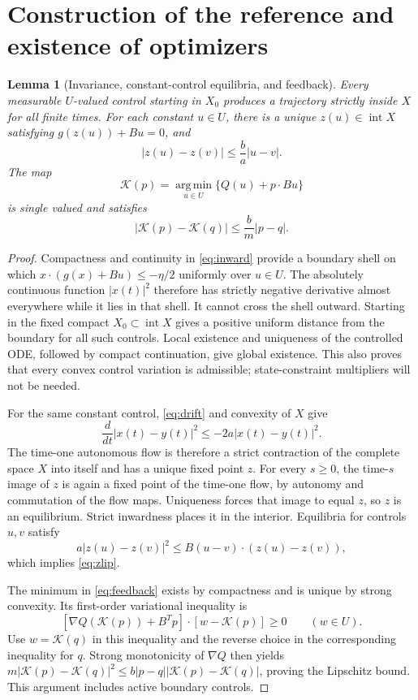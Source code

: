 \documentclass[11pt,a4paper]{article}
\newtheorem{lemma}[theorem]{Lemma}
\newcommand{\argmin}{\operatorname*{arg\,min}}
\begin{document}
\section{Construction of the reference and existence of optimizers}
\begin{lemma}[Invariance, constant-control equilibria, and feedback]\label{lem:maps}
Every measurable $U$-valued control starting in $X_0$ produces a trajectory
strictly inside $X$ for all finite times. For each constant $u\in U$,
there is a unique $z(u)\in\operatorname{int}X$ satisfying
$g(z(u))+Bu=0$, and
\begin{equation}\label{eq:zlip}
 |z(u)-z(v)|\leq\frac ba|u-v|.
\end{equation}
The map
\begin{equation}\label{eq:feedback}
 \mathcal K(p)=\argmin_{u\in U}\{Q(u)+p\cdot Bu\}
\end{equation}
is single valued and satisfies
\begin{equation}\label{eq:feedbacklip}
 |\mathcal K(p)-\mathcal K(q)|\leq\frac bm|p-q|.
\end{equation}
\end{lemma}
\begin{proof}
Compactness and continuity in \eqref{eq:inward} provide a boundary shell
on which $x\cdot(g(x)+Bu)\leq-\eta/2$ uniformly over $u\in U$.
The absolutely continuous function $|x(t)|^2$ therefore has strictly
negative derivative almost everywhere while it lies in that shell.
It cannot cross the shell outward. Starting in the fixed compact
$X_0\subset\operatorname{int}X$ gives a positive uniform distance from
the boundary for all such controls. Local existence and uniqueness of
the controlled ODE, followed by compact continuation, give global
existence. This also proves that every convex control variation is
admissible; state-constraint multipliers will not be needed.

For the same constant control, \eqref{eq:drift} and convexity of $X$ give
\[
 \frac d{dt}|x(t)-y(t)|^2\leq-2a|x(t)-y(t)|^2.
\]
The time-one autonomous flow is therefore a strict contraction of the
complete space $X$ into itself and has a unique fixed point $z$.
For every $s\geq0$, the time-$s$ image of $z$ is again a fixed point of
the time-one flow, by autonomy and commutation of the flow maps.
Uniqueness forces that image to equal $z$, so $z$ is an equilibrium.
Strict inwardness places it in the interior. Equilibria for controls
$u,v$ satisfy
\[
 a|z(u)-z(v)|^2
 \leq B(u-v)\cdot(z(u)-z(v)),
\]
which implies \eqref{eq:zlip}.

The minimum in \eqref{eq:feedback} exists by compactness and is unique
by strong convexity. Its first-order variational inequality is
\[
 [\nabla Q(\mathcal K(p))+B^Tp]\cdot[w-\mathcal K(p)]\geq0
 \qquad(w\in U).
\]
Use $w=\mathcal K(q)$ in this inequality and the reverse choice in
the corresponding inequality for $q$. Strong monotonicity of $\nabla Q$
then yields
$m|\mathcal K(p)-\mathcal K(q)|^2\leq
 b|p-q||\mathcal K(p)-\mathcal K(q)|$, proving the Lipschitz bound.
This argument includes active boundary controls.
\end{proof}
\end{document}

